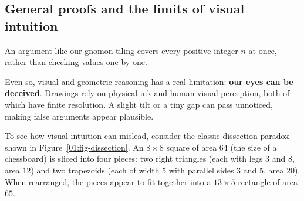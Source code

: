 \subsection{General proofs and the limits of visual intuition}

An argument like our gnomon tiling covers every positive integer $n$ at once, rather than checking values one by one.

Even so, visual and geometric reasoning has a real limitation: \textbf{our eyes can be deceived}. Drawings rely on physical ink and human visual perception, both of which have finite resolution. A slight tilt or a tiny gap can pass unnoticed, making false arguments appear plausible.

To see how visual intuition can mislead, consider the classic dissection paradox shown in Figure~\ref{01:fig-dissection}. An $8 \times 8$ square of area $64$ (the size of a chessboard) is sliced into four pieces: two right triangles (each with legs $3$ and $8$, area $12$) and two trapezoids (each of width $5$ with parallel sides $3$ and $5$, area $20$). When rearranged, the pieces appear to fit together into a $13 \times 5$ rectangle of area $65$.

